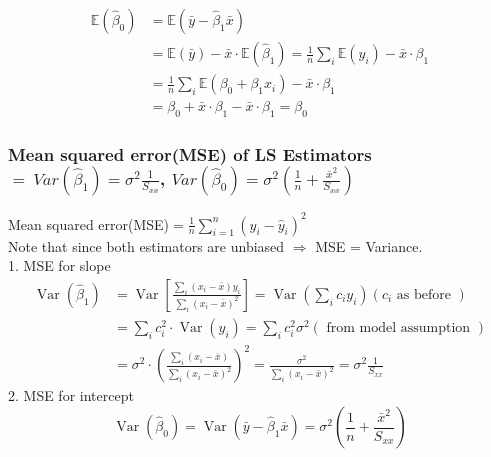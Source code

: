 \documentclass[11pt,a4paper]{article}
\begin{document}
\begin{equation}
    \begin{aligned}
        \mathbb{E}\left(\hat{\beta}_{0}\right) &=\mathbb{E}\left(\bar{y}-\hat{\beta}_{1} \bar{x}\right) \\
        &=\mathbb{E}(\bar{y})-\bar{x} \cdot \mathbb{E}\left(\hat{\beta}_{1}\right)=\frac{1}{n} \sum_{i} \mathbb{E}\left(y_{i}\right)-\bar{x} \cdot \beta_{1} \\
        &=\frac{1}{n} \sum_{i} \mathbb{E}\left(\beta_{0}+\beta_{1} x_{i}\right)-\bar{x} \cdot \beta_{1} \\
        &=\beta_{0}+\bar{x} \cdot \beta_{1}-\bar{x} \cdot \beta_{1}=\beta_{0}
        \end{aligned}
    \nonumber
\end{equation}

\subsubsection{Mean squared error(MSE) of LS Estimators $=\ Var(\hat{\beta}_1)=\sigma^{2} \frac{1}{S_{x x}}$, $Var(\hat{\beta}_0)=\sigma^{2}\left(\frac{1}{n}+\frac{\bar{x}^{2}}{S_{x x}}\right)$}
Mean squared error(MSE)$= \frac{1}{n}\sum_{i=1}^n(y_i-\hat{y}_i)^2$\\
Note that since both estimators are unbiased $\Rightarrow$ MSE = Variance.\\
1. MSE for slope
\begin{equation}
    \begin{aligned}
        \operatorname{Var}\left(\hat{\beta}_{1}\right) &=\operatorname{Var}\left[\frac{\sum_{i}\left(x_{i}-\bar{x}\right) y_{i}}{\sum_{i}\left(x_{i}-\bar{x}\right)^{2}}\right]=\operatorname{Var}\left(\sum_{i} c_{i} y_{i}\right)\left(c_{i} \text { as before }\right) \\
        &=\sum_{i} c_{i}^{2} \cdot \operatorname{Var}\left(y_{i}\right)=\sum_{i} c_{i}^{2} \sigma^{2}(\text { from model assumption }) \\
        &=\sigma^{2} \cdot\left(\frac{\sum_{i}\left(x_{i}-\bar{x}\right)}{\sum_{i}\left(x_{i}-\bar{x}\right)^{2}}\right)^{2}=\frac{\sigma^{2}}{\sum_{i}\left(x_{i}-\bar{x}\right)^{2}}=\sigma^{2} \frac{1}{S_{x x}}
        \end{aligned}
    \nonumber
\end{equation}
2. MSE for intercept\\
\begin{equation}
    \operatorname{Var}\left(\hat{\beta}_{0}\right)=\operatorname{Var}\left(\bar{y}-\hat{\beta}_{1} \bar{x}\right)=\sigma^{2}\left(\frac{1}{n}+\frac{\bar{x}^{2}}{S_{x x}}\right)
    \nonumber
\end{equation}
\end{document}
